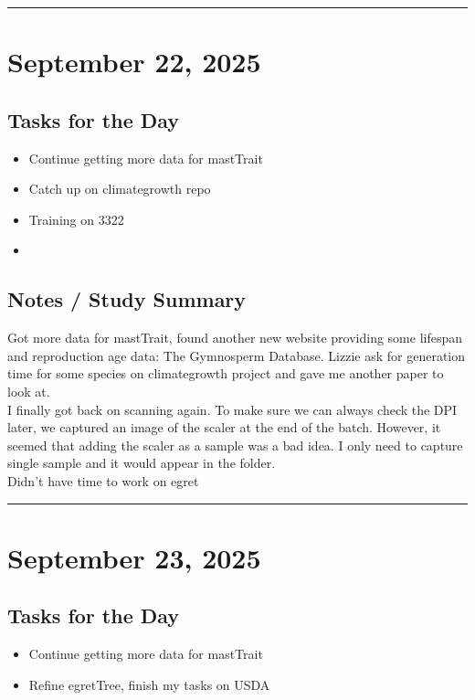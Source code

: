 \documentclass[12pt]{article}
\begin{document}
\vspace{1em}
\hrule
\vspace{1em}

\section*{September 22, 2025}

\subsection*{Tasks for the Day}
\begin{itemize}
    \item Continue getting more data for mastTrait
    \item Catch up on climategrowth repo
    \item Training on 3322
    \item 
\end{itemize}
\subsection*{Notes / Study Summary}
Got more data for mastTrait, found another new website providing some lifespan and reproduction age data: The Gymnosperm Database. Lizzie ask for generation time for some species on climategrowth project and gave me another paper to look at.\\
I finally got back on scanning again. To make sure we can always check the DPI later, we captured an image of the scaler at the end of the batch. However, it seemed that adding the scaler as a sample was a bad idea. I only need to capture single sample and it would appear in the folder.\\
Didn't have time to work on egret

\vspace{1em}
\hrule
\vspace{1em}

\section*{September 23, 2025}

\subsection*{Tasks for the Day}
\begin{itemize}
    \item Continue getting more data for mastTrait
    \item Refine egretTree, finish my tasks on USDA
\end{itemize}
\end{document}
